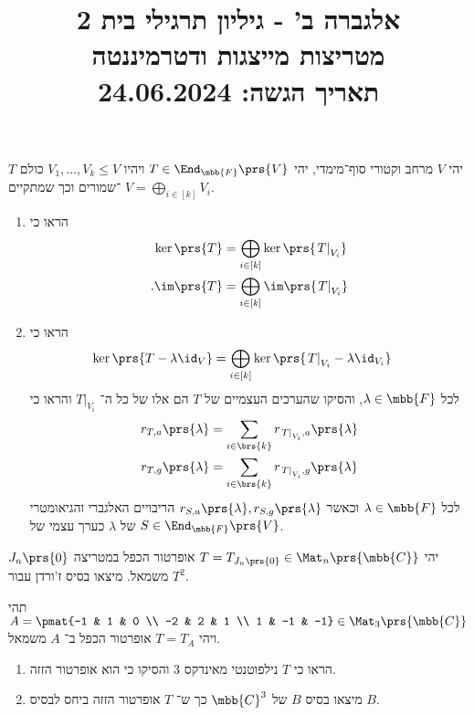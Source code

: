 \documentclass[a4paper,10pt,twoside,openany]{article}
\title{
אלגברה ב' - גיליון תרגילי בית 2 \\
מטריצות מייצגות ודטרמיננטה
\\
\vspace{1cm}
\large{תאריך הגשה: 24.06.2024}
}
\date{}
\begin{document}
\maketitle

\begin{exercise}
יהי
$V$
מרחב וקטורי סוף־מימדי, יהי
$T \in \End_{\mbb{F}}\prs{V}$
ויהיו
$V_1, \ldots, V_k \leq V$
כולם
$T$%
־שמורים וכך שמתקיים
$V = \bigoplus_{i \in [k]} V_i$.

\begin{enumerate}
\item 
הראו כי
\begin{align*}
\ker\prs{T} &= \bigoplus_{i \in [k]} \ker\prs{\left. T \right|_{V_i}} \\
\text{.} \im\prs{T} &= \bigoplus_{i \in [k]} \im\prs{\left. T \right|_{V_i}}
\end{align*}

\item
הראו כי
\begin{align*}
\ker\prs{T - \lambda \id_V} &= \bigoplus_{i \in [k]} \ker\prs{\left. T \right|_{V_i} - \lambda \id_{V_i}}
\end{align*}
לכל
$\lambda \in \mbb{F}$,
והסיקו שהערכים העצמיים של
$T$
הם אלו של כל ה־%
$\left. T \right|_{V_i}$
והראו כי
\begin{align*}
r_{T,a}\prs{\lambda} &= \sum_{i \in \brs{k}} r_{\left. T \right|_{V_i}, a}\prs{\lambda} \\
r_{T,g}\prs{\lambda} &= \sum_{i \in \brs{k}} r_{\left. T \right|_{V_i}, g}\prs{\lambda}
\end{align*}
לכל
$\lambda \in \mbb{F}$
וכאשר
$r_{S,a}\prs{\lambda}, r_{S,g}\prs{\lambda}$
הריבויים האלגברי והגיאומטרי של
$\lambda$
כערך עצמי של
$S \in \End_{\mbb{F}}\prs{V}$.
\end{enumerate}
\end{exercise}

\begin{exercise}
יהי
$T = T_{J_n\prs{0}} \in \Mat_n\prs{\mbb{C}}$
אופרטור הכפל במטריצה
$J_n\prs{0}$
משמאל.
מיצאו בסיס ז'ורדן עבור
$T^2$.
\end{exercise}

\begin{exercise}
תהי
$A = \pmat{-1 & 1 & 0 \\ -2 & 2 & 1 \\ 1 & -1 & -1} \in \Mat_3\prs{\mbb{C}}$
ויהי
$T = T_A$
אופרטור הכפל ב־%
$A$
משמאל.

\begin{enumerate}
\item הראו כי
$T$
נילפוטנטי מאינדקס
$3$
והסיקו כי הוא אופרטור הזזה.

\item
מיצאו בסיס
$B$
של
$\mbb{C}^3$
כך ש־%
$T$
אופרטור הזזה ביחס לבסיס
$B$.
\end{enumerate}
\end{exercise}
\end{document}
